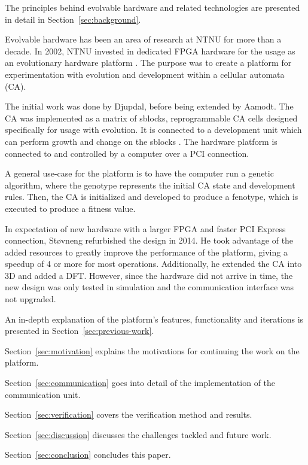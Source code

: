 
The principles behind evolvable hardware and related technologies are presented in detail in Section~\ref{sec:background}.

Evolvable hardware has been an area of research at NTNU for more than a decade.
In 2002, NTNU invested in dedicated FPGA hardware for the usage as an evolutionary hardware platform .
The purpose was to create a platform for experimentation with evolution and development within a cellular automata (CA).

The initial work was done by Djupdal, before being extended by Aamodt.
The CA was implemented as a matrix of sblocks, reprogrammable CA cells designed specifically for usage with evolution.
It is connected to a development unit which can perform growth and change on the sblocks .
The hardware platform is connected to and controlled by a computer over a PCI connection.

A general use-case for the platform is to have the computer run a genetic algorithm, where the genotype represents the initial CA state and development rules.
Then, the CA is initialized and developed to produce a fenotype, which is executed to produce a fitness value.

In expectation of new hardware with a larger FPGA and faster PCI Express connection, Støvneng refurbished the design in 2014.
He took advantage of the added resources to greatly improve the performance of the platform, giving a speedup of 4 or more for most operations.
Additionally, he extended the CA into 3D and added a DFT.
However, since the hardware did not arrive in time, the new design was only tested in simulation and the communication interface was not upgraded.

An in-depth explanation of the platform's features, functionality and iterations is presented in Section~\ref{sec:previous-work}.


Section~\ref{sec:motivation} explains the motivations for continuing the work on the platform.

Section~\ref{sec:communication} goes into detail of the implementation of the communication unit.

Section~\ref{sec:verification} covers the verification method and results.

Section~\ref{sec:discussion} discusses the challenges tackled and future work.

Section~\ref{sec:conclusion} concludes this paper.

